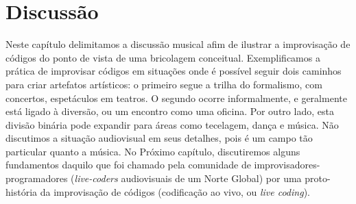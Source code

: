 \section{Discussão}

Neste capítulo delimitamos a discussão musical afim de ilustrar a improvisação de códigos do ponto de vista de uma bricolagem conceitual. Exemplificamos a prática de improvisar códigos em situações onde é possível seguir dois caminhos para criar artefatos artísticos: o primeiro segue a trilha do formalismo, com concertos, espetáculos em teatros. O segundo ocorre informalmente, e geralmente está ligado à diversão, ou um encontro como uma oficina. Por outro lado, esta divisão binária pode expandir para áreas como tecelagem, dança e música. Não discutimos a situação audiovisual em seus detalhes, pois é um campo tão particular quanto a música. No Próximo capítulo, discutiremos alguns fundamentos daquilo que foi chamado pela comunidade de improvisadores-programadores (\emph{live-coders} audiovisuais de um Norte Global) por uma proto-história da improvisação de códigos (codificação ao vivo, ou \emph{live coding}). 
